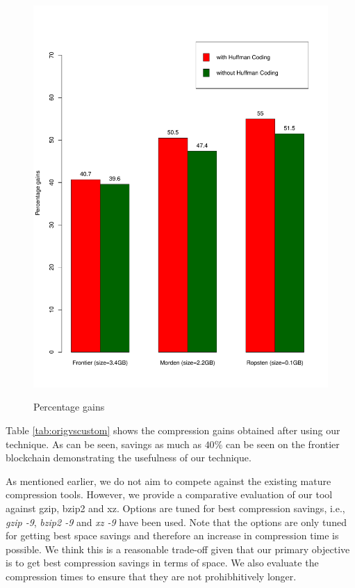 \begin{figure}[!t]
\begin{floatrow}
{	\includegraphics[scale=0.45]{plots/customgains}
}{ \caption{Percentage gains}
\label{fig:origvscustom}
}
\end{floatrow}
\end{figure}

\FloatBarrier
Table \ref{tab:origvscustom} shows the compression gains obtained after using our technique.
As can be seen, savings as much as $40\%$ can be seen on the frontier
blockchain demonstrating the usefulness of our technique.

As mentioned earlier, we do not aim to compete against the existing mature compression tools.
However, we provide a comparative evaluation of our tool against gzip, bzip2 and xz. 
Options are tuned for best compression savings, i.e., \emph{gzip -9}, \emph{bzip2 -9} and \emph{xz -9} have been used. 
Note that the options are only tuned for getting best space savings and therefore an increase in compression time is possible.
We think this is a reasonable trade-off given that our primary objective is to get best compression savings in terms of space.
We also evaluate the compression times to ensure that they are not
prohibhitively longer.

